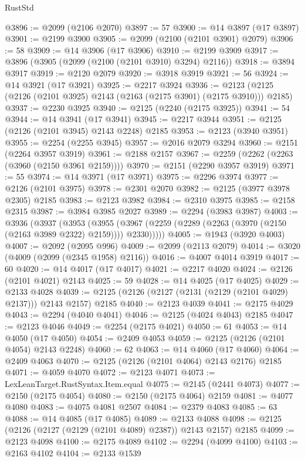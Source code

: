\begin{lexlean}{RustStd}
\begin{coremodule}
@3896 := @2099 (@2106 @2070)
@3897 := 57
@3900 := @14 @3897 (@17 @3897)
@3901 := @2199 @3900
@3905 := @2099 (@2100 (@2101 @3901) @2079)
@3906 := 58
@3909 := @14 @3906 (@17 @3906)
@3910 := @2199 @3909
@3917 := @3896 (@3905 (@2099 (@2100 (@2101 @3910) @3294) @2116))
@3918 := @3894 @3917
@3919 := @2120 @2079
@3920 := @3918 @3919
@3921 := 56
@3924 := @14 @3921 (@17 @3921)
@3925 := @2217 @3924
@3936 := @2123 (@2125 (@2126 (@2101 @3925) @2143 (@2163 (@2175 @3901) (@2175 @3910))) @2185)
@3937 := @2230 @3925
@3940 := @2125 (@2240 (@2175 @3925))
@3941 := 54
@3944 := @14 @3941 (@17 @3941)
@3945 := @2217 @3944
@3951 := @2125 (@2126 (@2101 @3945) @2143 @2248) @2185
@3953 := @2123 (@3940 @3951)
@3955 := @2254 (@2255 @3945)
@3957 := @2016 @2079 @3294
@3960 := @2151 (@2264 @3957 @3919)
@3961 := @2188 @2157
@3967 := @2259 (@2262 (@2263 (@3960 (@2150 @3961 @2159))))
@3970 := @2151 (@2290 @3957 @3919)
@3971 := 55
@3974 := @14 @3971 (@17 @3971)
@3975 := @2296 @3974
@3977 := @2126 (@2101 @3975)
@3978 := @2301 @2070
@3982 := @2125 (@3977 @3978 @2305) @2185
@3983 := @2123 @3982
@3984 := @2310 @3975
@3985 := @2158 @2315
@3987 := @3984 @3985 @2027
@3989 := @2294 (@3983 @3987)
@4003 := @3936
    (@3937
      (@3953
        (@3955 (@3967 (@2259 (@2289 (@2263 (@3970 (@2150 (@2163 @3989 @2322) @2159)))) @2330)))))
@4005 := @1943 (@3920 @4003)
@4007 := @2092 (@2095 @996)
@4009 := @2099 (@2113 @2079)
@4014 := @3020 (@4009 (@2099 (@2345 @1958) @2116))
@4016 := @4007 @4014 @3919
@4017 := 60
@4020 := @14 @4017 (@17 @4017)
@4021 := @2217 @4020
@4024 := @2126 (@2101 @4021) @2143
@4025 := 59
@4028 := @14 @4025 (@17 @4025)
@4029 := @2133 @4028
@4039 := @2125 (@2126 (@2127 (@2131 (@2129 (@2101 @4029) @2137))) @2143 @2157) @2185
@4040 := @2123 @4039
@4041 := @2175 @4029
@4043 := @2294 (@4040 @4041)
@4046 := @2125 (@4024 @4043) @2185
@4047 := @2123 @4046
@4049 := @2254 (@2175 @4021)
@4050 := 61
@4053 := @14 @4050 (@17 @4050)
@4054 := @2409 @4053
@4059 := @2125 (@2126 (@2101 @4054) @2143 @2248)
@4060 := 62
@4063 := @14 @4060 (@17 @4060)
@4064 := @2409 @4063
@4070 := @2125 (@2126 (@2101 @4064) @2143 @2176) @2185
@4071 := @4059 @4070
@4072 := @2123 @4071
@4073 := LexLeanTarget.RustSyntax.Item.equal
@4075 := @2145 (@2441 @4073)
@4077 := @2150 (@2175 @4054)
@4080 := @2150 (@2175 @4064) @2159
@4081 := @4077 @4080
@4083 := @4075 @4081 @2507
@4084 := @2379 @4083
@4085 := 63
@4088 := @14 @4085 (@17 @4085)
@4089 := @2133 @4088
@4098 := @2125 (@2126 (@2127 (@2129 (@2101 @4089) @2387)) @2143 @2157) @2185
@4099 := @2123 @4098
@4100 := @2175 @4089
@4102 := @2294 (@4099 @4100)
@4103 := @2163 @4102
@4104 := @2133 @1539

\end{coremodule}
\end{lexlean}
